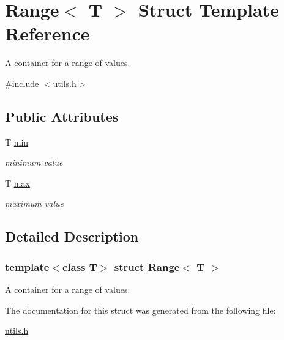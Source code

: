 \hypertarget{structRange}{
\section{Range$<$ T $>$ Struct Template Reference}
\label{structRange}
}


A container for a range of values.  




{\ttfamily \#include $<$utils.h$>$}

\subsection*{Public Attributes}
\begin{DoxyCompactItemize}
\item 
\hypertarget{structRange_ab931e1f11f92c147bca1dfe7555b159d}{
T \hyperlink{structRange_ab931e1f11f92c147bca1dfe7555b159d}{min}}
\label{structRange_ab931e1f11f92c147bca1dfe7555b159d}

\begin{DoxyCompactList}\small\item\em minimum value \item\end{DoxyCompactList}\item 
\hypertarget{structRange_ab9f49430e13b2acc6f1a51b25b6d875a}{
T \hyperlink{structRange_ab9f49430e13b2acc6f1a51b25b6d875a}{max}}
\label{structRange_ab9f49430e13b2acc6f1a51b25b6d875a}

\begin{DoxyCompactList}\small\item\em maximum value \item\end{DoxyCompactList}\end{DoxyCompactItemize}


\subsection{Detailed Description}
\subsubsection*{template$<$class T$>$ struct Range$<$ T $>$}

A container for a range of values. 

The documentation for this struct was generated from the following file:\begin{DoxyCompactItemize}
\item 
\hyperlink{utils_8h}{utils.h}\end{DoxyCompactItemize}
